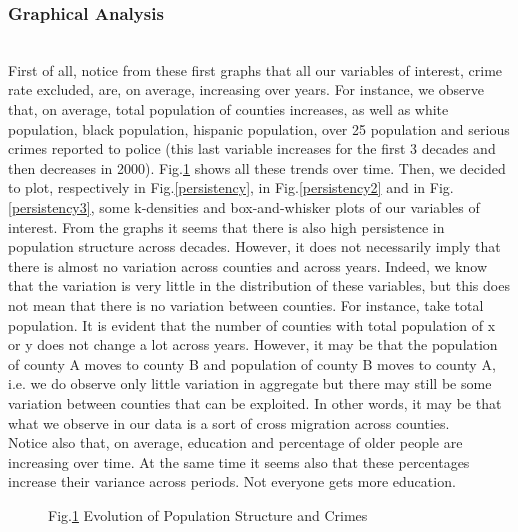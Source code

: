 \documentclass[a4paper,12pt]{article}
\begin{document}


\subsubsection{Graphical Analysis}
\\First of all, notice from these first graphs that all our variables of interest, crime rate excluded, are, on average, increasing over years. For instance, we observe that, on average, total population of counties increases, as well as white population, black population, hispanic population, over 25 population and serious crimes reported to police (this last variable increases for the first 3 decades and then decreases in 2000). Fig.\ref{evolution} shows all these trends over time. Then, we decided to plot, respectively in Fig.\ref{persistency}, in Fig.\ref{persistency2} and in Fig.\ref{persistency3}, some k-densities and box-and-whisker plots of our variables of interest. From the graphs it seems that there is also high persistence in population structure across decades. However, it does not necessarily imply that there is almost no variation across counties and across years. Indeed, we know that the variation is very little in the distribution of these variables, but this does not mean that there is no variation between counties. For instance, take total population. It is evident that the number of counties with total population of x or y does not change a lot across years. However, it may be that the population of county A moves to county B and population of county B moves to county A, i.e. we do observe only little variation in aggregate but there may still be some variation between counties that can be exploited. In other words, it may be that what we observe in our data is a sort of cross migration across counties.
\\Notice also that, on average, education and percentage of older people are increasing over time. At the same time it seems also that these percentages increase their variance across periods. Not everyone gets more education.

\begin{figure}[hp!]
\caption{Fig.\ref{evolution} Evolution of Population Structure and Crimes}
\label{evolution}
\end{figure}
\end{document}
